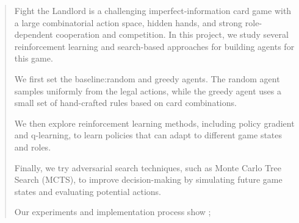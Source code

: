 \begin{abstract}
    Fight the Landlord is a challenging imperfect-information card game with a large combinatorial action space,
    hidden hands, and strong role-dependent cooperation and competition. In this project, we study several reinforcement
    learning and search-based approaches for building agents for this game.

    We first set the baseline:random and greedy agents. The random agent samples uniformly from the legal actions, while the greedy agent uses a small set of hand-crafted rules based on card combinations.

    We then explore reinforcement learning methods, including policy gradient and q-learning, to learn policies that can adapt to different game states and roles.

    Finally, we try adversarial search techniques, such as Monte Carlo Tree Search (MCTS), to improve decision-making by simulating future game states and evaluating potential actions.

    Our experiments and implementation process show ;
\end{abstract}
